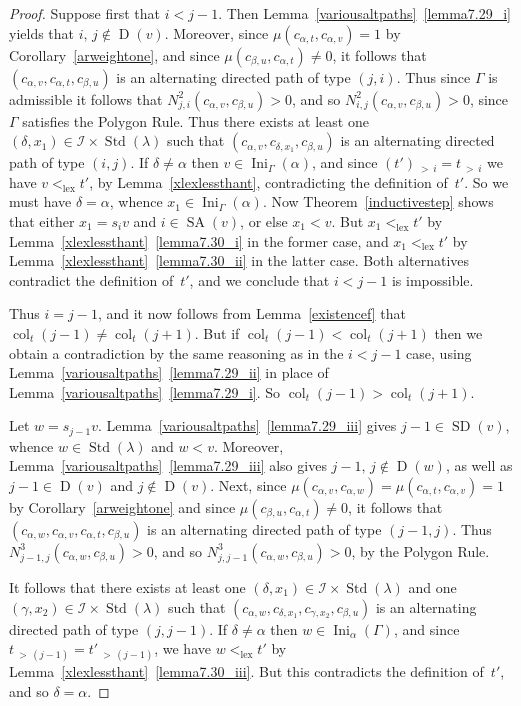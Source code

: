\documentclass[ALCO,ThmDefs,Unicode,epreuves]{cedram}
\DeclareMathOperator{\Ini}{Ini}
\DeclareMathOperator{\lex}{lex}
\DeclareMathOperator{\col}{col}
\newcommand{\morethan}[2]{#1\,{_{>\,#2}}}
\DeclareMathOperator{\STD}{Std}
\DeclareMathOperator{\SD}{SD}
\DeclareMathOperator{\SA}{SA}
\DeclareMathOperator{\D}{D}
\begin{document}
\begin{proof}
Suppose first that $i<j-1$. Then
Lemma~\ref{variousaltpaths}~\ref{lemma7.29_i} yields that $i,\,j\notin\D(v)$.
Moreover, since $\mu(c_{\alpha,t},c_{\alpha,v})=1$
by Corollary~\ref{arweightone}, and since $\mu(c_{\beta,u},c_{\alpha,t})\neq 0$,
it follows that $(c_{\alpha,v},c_{\alpha,t},c_{\beta,u})$ is
an alternating directed path of type $(j,i)$. Thus since $\Gamma$ is admissible
it follows that $N^{2}_{j,i}(c_{\alpha,v},c_{\beta,u})>0$, and so
$N^{2}_{i,j}(c_{\alpha,v},c_{\beta,u})>0$, since $\Gamma$ satisfies the
Polygon Rule.
Thus there exists at least one $(\delta,x_1)\in\mathcal{I}\times\STD(\lambda)$
such that $(c_{\alpha,v},c_{\delta,x_1},c_{\beta,u})$
is an alternating directed path of type $(i,j)$. If $\delta\neq\alpha$ then
$v\in\Ini_{\Gamma}(\alpha)$, and since $\morethan {(t')}i=\morethan ti$ we have
$v<_{\lex}t'$, by Lemma~\ref{xlexlessthant}, contradicting the definition
of~$t'$. So we must have $\delta=\alpha$, whence $x_1\in\Ini_{\Gamma}(\alpha)$. Now
Theorem~\ref{inductivestep} shows that either $x_1=s_iv$ and $i\in\SA(v)$, or else
$x_1<v$. But $x_1<_{\lex}t'$ by Lemma~\ref{xlexlessthant}~\ref{lemma7.30_i}
in the former case, and $x_1<_{\lex}t'$ by Lemma~\ref{xlexlessthant}~\ref{lemma7.30_ii} in
the latter case. Both alternatives contradict the definition of~$t'$,
and we conclude that $i<j-1$ is impossible.

Thus $i=j-1$, and it now follows from Lemma~\ref{existencef} that
$\col_{t}(j-1)\neq\col_{t}(j+1)$. But if $\col_{t}(j-1)<\col_{t}(j+1)$ then
we obtain a contradiction by the same reasoning as in the $i<j-1$ case,
using Lemma~\ref{variousaltpaths}~\ref{lemma7.29_ii} in place of Lemma~\ref{variousaltpaths}~\ref{lemma7.29_i}.
So $\col_{t}(j-1)>\col_{t}(j+1)$.

Let $w=s_{j-1}v$. Lemma~\ref{variousaltpaths}~\ref{lemma7.29_iii} gives
$j-1\in\SD(v)$, whence $w\in\STD(\lambda)$ and $w<v$.
Moreover, Lemma~\ref{variousaltpaths}~\ref{lemma7.29_iii} also gives
$j-1,\,j\notin\D(w)$, as well as $j-1\in\D(v)$ and $j\notin\D(v)$.
Next, since $\mu(c_{\alpha,v},c_{\alpha,w})=\mu(c_{\alpha,t},c_{\alpha,v})=1$
by Corollary~\ref{arweightone} and since $\mu(c_{\beta,u},c_{\alpha,t})\neq 0$,
it follows that
$(c_{\alpha,w},c_{\alpha,v},c_{\alpha,t},c_{\beta,u})$ is
an alternating directed path of type $(j-1,j)$.
Thus $N^{3}_{j-1,j}(c_{\alpha,w},c_{\beta,u})>0$, and so
$N^{3}_{j,j-1}(c_{\alpha,w},c_{\beta,u})>0$, by the Polygon Rule.

It follows that there exists at least one $(\delta,x_1)\in\mathcal{I}\times\STD(\lambda)$
and one $(\gamma,x_2)\in\mathcal{I}\times\STD(\lambda)$
such that $(c_{\alpha,w},c_{\delta,x_1},c_{\gamma,x_2},c_{\beta,u})$
is an alternating directed path of type $(j,j-1)$.
If $\delta\neq\alpha$ then $w\in\Ini_{\alpha}(\Gamma)$, and
since $\morethan t{(j-1)}=\morethan {t'}{(j-1)}$, we have $w<_{\lex}t'$ by
Lemma~\ref{xlexlessthant}~\ref{lemma7.30_iii}. But this contradicts the definition of~$t'$,
and so $\delta=\alpha$.


\end{proof}
\end{document}
